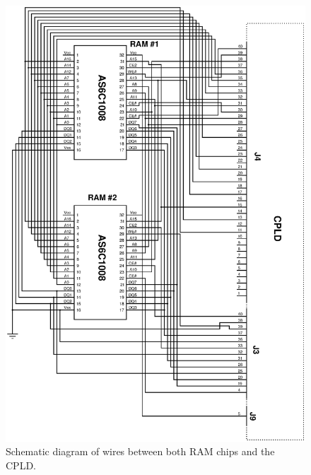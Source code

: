 \documentclass{article}
\begin{document}
\begin{figure}
\center
\includegraphics[scale=0.7]{figure/schematics/RAM_to_CPLD}
\caption{Schematic diagram of wires between both RAM chips and
the CPLD.}
\label{fig:ram_to_cpld}
\end{figure}
\end{document}
